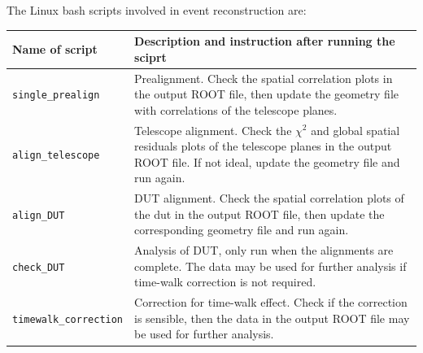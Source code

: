 The Linux bash scripts involved in event reconstruction are:
\newpage
\begin{table}[h!]
    \centering
    \begin{tabular}{ | m{4.5cm} | m{9.5cm}| } 
         \hline
         Name of script & Description and instruction after running the sciprt\\
         \hline
         \verb|single_prealign| & Prealignment. Check the spatial correlation plots in the output ROOT file, then update the geometry file with correlations of the telescope planes.\\
         \hline
         \verb|align_telescope| & Telescope alignment. Check the $\chi^2$ and global spatial residuals plots of the telescope planes in the output ROOT file. If not ideal, update the geometry file and run again. \\
         \hline
         \verb|align_DUT| & DUT alignment. Check the spatial correlation plots of the dut in the output ROOT file, then update the corresponding geometry file and run again.\\
         \hline
         \verb|check_DUT| & Analysis of DUT, only run when the alignments are complete. The data may be used for further analysis if time-walk correction is not required. \\
         \hline
         \verb|timewalk_correction| & Correction for time-walk effect. Check if the correction is sensible, then the data in the output ROOT file may be used for further analysis.\\
         \hline
    \end{tabular}
\end{table}

